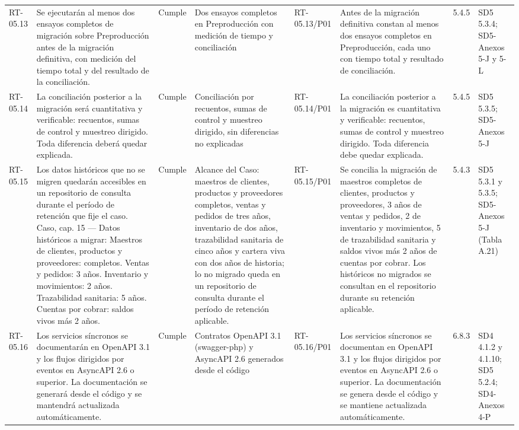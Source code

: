\documentclass[oficio,firma,final]{lafrox}
\begin{document}
\begin{landscape}
{\begin{longtable}{@{}F{0.054} F{0.173} F{0.061} F{0.191} F{0.106} F{0.180} F{0.067} F{0.168}@{}}
  RT-05.13 & Se ejecutarán al menos dos ensayos completos de migración sobre Preproducción antes de la migración definitiva, con medición del tiempo total y del resultado de la conciliación. & Cumple & Dos ensayos completos en Preproducción con medición de tiempo y conciliación & RT-05.13/\allowbreak{}P01 & Antes de la migración definitiva constan al menos dos ensayos completos en Preproducción, cada uno con tiempo total y resultado de conciliación. & 5.4.5 & SD5 5.3.4; SD5-Anexos 5-J y 5-L  \\
  RT-05.14 & La conciliación posterior a la migración será cuantitativa y verificable: recuentos, sumas de control y muestreo dirigido. Toda diferencia deberá quedar explicada. & Cumple & Conciliación por recuentos, sumas de control y muestreo dirigido, sin diferencias no explicadas & RT-05.14/\allowbreak{}P01 & La conciliación posterior a la migración es cuantitativa y verificable: recuentos, sumas de control y muestreo dirigido. Toda diferencia debe quedar explicada. & 5.4.5 & SD5 5.3.5; SD5-Anexos 5-J  \\
  RT-05.15 & Los datos históricos que no se migren quedarán accesibles en un repositorio de consulta durante el período de retención que fije el caso. Caso, cap. 15 — Datos históricos a migrar: Maestros de clientes, productos y proveedores: completos. Ventas y pedidos: 3 años. Inventario y movimientos: 2 años. Trazabilidad sanitaria: 5 años. Cuentas por cobrar: saldos vivos más 2 años. & Cumple & Alcance del Caso: maestros de clientes, productos y proveedores completos, ventas y pedidos de tres años, inventario de dos años, trazabilidad sanitaria de cinco años y cartera viva con dos años de historia; lo no migrado queda en un repositorio de consulta durante el período de retención aplicable. & RT-05.15/\allowbreak{}P01 & Se concilia la migración de maestros completos de clientes, productos y proveedores, 3 años de ventas y pedidos, 2 de inventario y movimientos, 5 de trazabilidad sanitaria y saldos vivos más 2 años de cuentas por cobrar. Los históricos no migrados se consultan en el repositorio durante su retención aplicable. & 5.4.3 & SD5 5.3.1 y 5.3.5; SD5-Anexos 5-J (Tabla A.21)  \\
  RT-05.16 & Los servicios síncronos se documentarán en OpenAPI 3.1 y los flujos dirigidos por eventos en AsyncAPI 2.6 o superior. La documentación se generará desde el código y se mantendrá actualizada automáticamente. & Cumple & Contratos OpenAPI 3.1 (swagger-php) y AsyncAPI 2.6 generados desde el código & RT-05.16/\allowbreak{}P01 & Los servicios síncronos se documentan en OpenAPI 3.1 y los flujos dirigidos por eventos en AsyncAPI 2.6 o superior. La documentación se genera desde el código y se mantiene actualizada automáticamente. & 6.8.3 & SD4 4.1.2 y 4.1.10; SD5 5.2.4; SD4-Anexos 4-P  \\

\end{longtable}}
\end{landscape}
\end{document}
